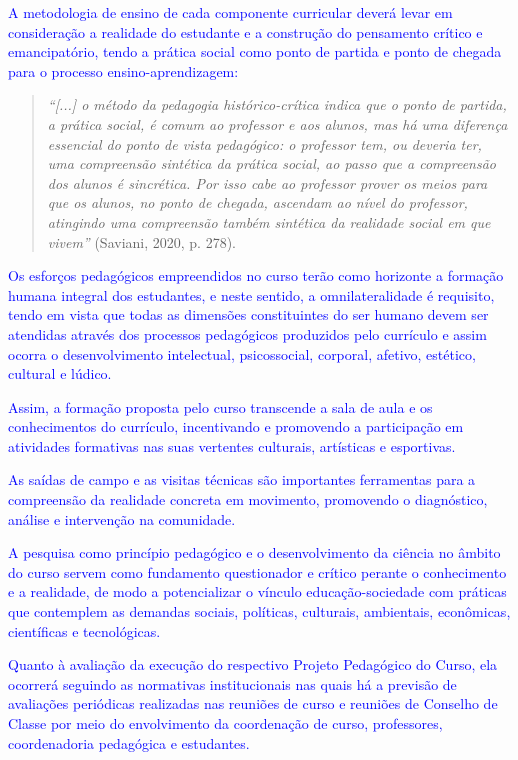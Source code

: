 \documentclass{../../modelos/latex-shared/ifsc-ppc}
\newcommand{\revisao}[1]{\textcolor{blue}{#1}}
\newcommand{\revisao}[1]{#1}
\begin{document}
\revisao{A metodologia de ensino de cada componente curricular deverá levar em consideração a realidade do estudante e a construção do pensamento crítico e emancipatório, tendo a prática social como ponto de partida e ponto de chegada para o processo ensino-aprendizagem:
\begin{quote}
\small
\textit{``[...] o método da pedagogia histórico-crítica indica que o ponto de partida, a prática social, é comum ao professor e aos alunos, mas há uma diferença essencial do ponto de vista pedagógico: o professor tem, ou deveria ter, uma compreensão sintética da prática social, ao passo que a compreensão dos alunos é sincrética. Por isso cabe ao professor prover os meios para que os alunos, no ponto de chegada, ascendam ao nível do professor, atingindo uma compreensão também sintética da realidade social em que vivem''} (Saviani, 2020, p. 278).
\end{quote}}

\revisao{Os esforços pedagógicos empreendidos no curso terão como horizonte a formação humana integral dos estudantes, e neste sentido, a omnilateralidade é requisito, tendo em vista que todas as dimensões constituintes do ser humano devem ser atendidas através dos processos pedagógicos produzidos pelo currículo e assim ocorra o desenvolvimento intelectual, psicossocial, corporal, afetivo, estético, cultural e lúdico.}

\revisao{Assim, a formação proposta pelo curso transcende a sala de aula e os conhecimentos do currículo, incentivando e promovendo a participação em atividades formativas nas suas vertentes culturais, artísticas e esportivas.}

\revisao{As saídas de campo e as visitas técnicas são importantes ferramentas para a compreensão da realidade concreta em movimento, promovendo o diagnóstico, análise e intervenção na comunidade.}

\revisao{A pesquisa como princípio pedagógico e o desenvolvimento da ciência no âmbito do curso servem como fundamento questionador e crítico perante o conhecimento e a realidade, de modo a potencializar o vínculo educação-sociedade com práticas que contemplem as demandas sociais, políticas, culturais, ambientais, econômicas, científicas e tecnológicas.}

\revisao{Quanto à avaliação da execução do respectivo Projeto Pedagógico do Curso, ela ocorrerá seguindo as normativas institucionais nas quais há a previsão de avaliações periódicas realizadas nas reuniões de curso e reuniões de Conselho de Classe por meio do envolvimento da coordenação de curso, professores, coordenadoria pedagógica e estudantes.}
\end{document}
